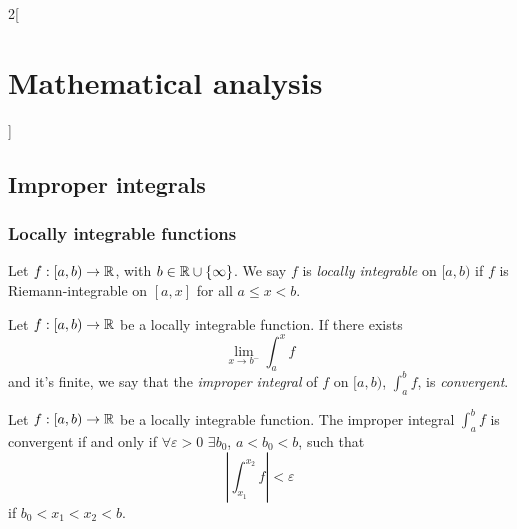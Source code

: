 \documentclass[../../../main_math.tex]{subfiles}
\begin{document}
\begin{multicols}{2}[\section{Mathematical analysis}]
  \subsection{Improper integrals}
  \subsubsection{Locally integrable functions}
  \begin{definition}
    Let $f:[a,b)\rightarrow\mathbb{R} $, with $b\in\mathbb{R} \cup\{\infty\}$. We say $f$ is \emph{locally integrable} on $[a,b)$ if $f$ is Riemann-integrable on $[a,x]$ for all $a\leq x<b$.
  \end{definition}
  \begin{definition}
    Let $f:[a,b)\rightarrow\mathbb{R} $ be a locally integrable function. If there exists $$\lim_{x\to b^-}\int_a^x f$$ and it's finite, we say that the \emph{improper integral} of $f$ on $[a,b)$, $\displaystyle\int_a^b f$, is \emph{convergent}.
  \end{definition}
  \begin{theorem}
    Let $f:[a,b)\rightarrow\mathbb{R} $ be a locally integrable function. The improper integral $\displaystyle\int_a^b f$ is convergent if and only if $\forall\varepsilon>0$ $\exists b_0$, $a<b_0<b$, such that $$\left|\int_{x_1}^{x_2} f\right|<\varepsilon$$ if $b_0<x_1<x_2<b$.
  \end{theorem}

\end{multicols}
\end{document}
